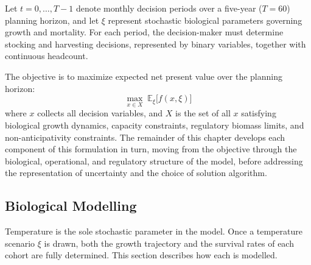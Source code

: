 \documentclass[12pt,a4paper]{article}
\begin{document}
Let $t = 0, \ldots, T - 1$ denote monthly decision periods over a five-year ($T=60$) planning horizon, and let $\xi$ represent stochastic biological parameters governing growth and mortality. For each period, the decision-maker must determine stocking and harvesting decisions, represented by binary variables, together with continuous headcount.
 
The objective is to maximize expected net present value over the planning horizon:
\begin{equation}
  \max_{x \in X}\; \mathbb{E}_{\xi}\bigl[f(x, \xi)\bigr]
\end{equation}
where $x$ collects all decision variables, and $X$ is the set of all $x$ satisfying biological growth dynamics, capacity constraints, regulatory biomass limits, and non-anticipativity constraints. The remainder of this chapter develops each component of this formulation in turn, moving from the objective through the biological, operational, and regulatory structure of the model, before addressing the representation of uncertainty and the choice of solution algorithm.
 
 
\subsection{Biological Modelling}
\label{sec:biology}
 
Temperature is the sole stochastic parameter in the model. Once a temperature scenario $\xi$ is drawn, both the growth trajectory and the survival rates of each cohort are fully determined. This section describes how each is modelled.
 
\end{document}
